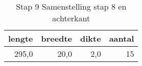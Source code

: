\begin{table}[h!]
\centering
\caption{Stap 9 Samenstelling stap 8 en achterkant}
\begin{tabular}{rrrr}
\toprule
 lengte &  breedte &  dikte &  aantal \\
\midrule
  295,0 &     20,0 &    2,0 &      15 \\
\bottomrule
\end{tabular}
\end{table}
